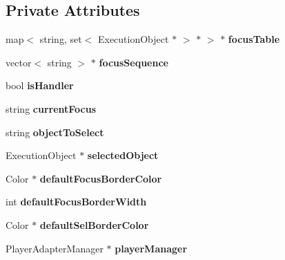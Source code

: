 \subsection*{Private Attributes}
\begin{CompactItemize}
\item 
map$<$ string, set$<$ ExecutionObject $\ast$ $>$ $\ast$ $>$ $\ast$ {\bf focusTable}\label{classbr_1_1pucrio_1_1telemidia_1_1ginga_1_1ncl_1_1focus_1_1FormatterFocusManager_2bbfdc2c15808904d02eccf84891e835}

\item 
vector$<$ string $>$ $\ast$ {\bf focusSequence}\label{classbr_1_1pucrio_1_1telemidia_1_1ginga_1_1ncl_1_1focus_1_1FormatterFocusManager_76e0d913b1daa06da55b64ae9175283e}

\item 
bool {\bf isHandler}\label{classbr_1_1pucrio_1_1telemidia_1_1ginga_1_1ncl_1_1focus_1_1FormatterFocusManager_439756410b3e5309a20186b76a977f6c}

\item 
string {\bf currentFocus}\label{classbr_1_1pucrio_1_1telemidia_1_1ginga_1_1ncl_1_1focus_1_1FormatterFocusManager_3b65a71da86f54a40a3b0bdb6e456841}

\item 
string {\bf objectToSelect}\label{classbr_1_1pucrio_1_1telemidia_1_1ginga_1_1ncl_1_1focus_1_1FormatterFocusManager_feb20d10c332f4b4fcf9e2bc26164596}

\item 
ExecutionObject $\ast$ {\bf selectedObject}\label{classbr_1_1pucrio_1_1telemidia_1_1ginga_1_1ncl_1_1focus_1_1FormatterFocusManager_49970238d1ded849e4701abfb189ff47}

\item 
Color $\ast$ {\bf defaultFocusBorderColor}\label{classbr_1_1pucrio_1_1telemidia_1_1ginga_1_1ncl_1_1focus_1_1FormatterFocusManager_12341127ef57b47c2b0096fff9385076}

\item 
int {\bf defaultFocusBorderWidth}\label{classbr_1_1pucrio_1_1telemidia_1_1ginga_1_1ncl_1_1focus_1_1FormatterFocusManager_eb77ed56de9fd730ecc6c0f2bfd16ec6}

\item 
Color $\ast$ {\bf defaultSelBorderColor}\label{classbr_1_1pucrio_1_1telemidia_1_1ginga_1_1ncl_1_1focus_1_1FormatterFocusManager_ad8de60d19b1801814c6c5641aaaa7ac}

\item 
PlayerAdapterManager $\ast$ {\bf playerManager}\label{classbr_1_1pucrio_1_1telemidia_1_1ginga_1_1ncl_1_1focus_1_1FormatterFocusManager_4df40f950b752188368d90063891852c}


\end{CompactItemize}
